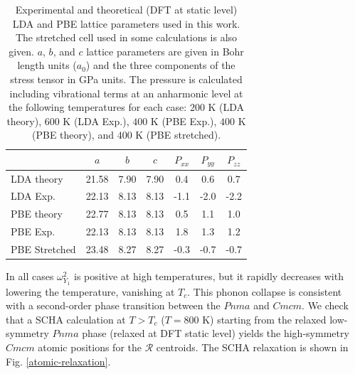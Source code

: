 \begin{table}
\begin{center}
\begin{tabular*}{0.65\textwidth}{l c c c c c c}
 \hline
 \hline
            & $a$  & $b$  & $c$  & $P_{xx}$ & $P_{yy}$ & $P_{zz}$ \\
 \hline
 LDA theory                  &  21.58  &  7.90  & 7.90  &  0.4  &  0.6  &  0.7  \\
 LDA Exp.                    &  22.13  &  8.13  & 8.13  & -1.1  & -2.0  & -2.2  \\
 PBE theory                  &  22.77  &  8.13  & 8.13  &  0.5  &  1.1  &  1.0  \\
 PBE Exp.                    &  22.13  &  8.13  & 8.13  &  1.8  &  1.3  &  1.2  \\
 PBE Stretched               &  23.48  &  8.27  & 8.27  & -0.3  & -0.7  & -0.7  \\
 \hline
 \hline
\end{tabular*}
\end{center}
\caption{Experimental\cite{zhao2014ultralow} and theoretical (DFT at static level) LDA and PBE lattice parameters used in this work. The stretched cell used in some calculations is also given. $a$, $b$, and $c$ lattice 
parameters are given in Bohr length units ($a_0$) and the three components of the stress tensor in GPa units. The pressure is calculated including vibrational terms at an anharmonic level at the following temperatures for 
each case: $200$ K (LDA theory), $600$ K (LDA Exp.), $400$ K (PBE Exp.), $400$ K (PBE theory), and $400$ K (PBE stretched).}
\label{cell-parameters}
\end{table}
In all cases $\omega_{Y_{1}}^{2}$ is positive at high temperatures, but it rapidly decreases with lowering the temperature, vanishing at $T_{c}$. This phonon collapse is consistent with a second-order phase transition between
the $Pnma$ and $Cmcm$. We check that a SCHA calculation at $T>T_{c}$ ($T=800$ K) starting from the relaxed low-symmetry $Pnma$ phase (relaxed at DFT static level) yields the high-symmetry $Cmcm$ atomic positions for the 
$\boldsymbol{\mathcal{R}}$ centroids. The SCHA relaxation is shown in Fig. \ref{atomic-relaxation}.
